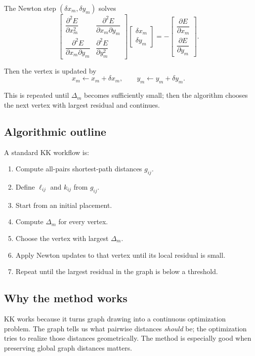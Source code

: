 \documentclass[11pt]{article}
\begin{document}
The Newton step $(\delta x_m, \delta y_m)$ solves
\[
\begin{bmatrix}
\dfrac{\partial^2 E}{\partial x_m^2} &
\dfrac{\partial^2 E}{\partial x_m \partial y_m} \\[1.2ex]
\dfrac{\partial^2 E}{\partial x_m \partial y_m} &
\dfrac{\partial^2 E}{\partial y_m^2}
\end{bmatrix}
\begin{bmatrix}
\delta x_m \\ \delta y_m
\end{bmatrix}
=
-
\begin{bmatrix}
\dfrac{\partial E}{\partial x_m} \\[1.2ex]
\dfrac{\partial E}{\partial y_m}
\end{bmatrix}.
\]

Then the vertex is updated by
\[
x_m \leftarrow x_m + \delta x_m,
\qquad
y_m \leftarrow y_m + \delta y_m.
\]

This is repeated until $\Delta_m$ becomes sufficiently small; then the
algorithm chooses the next vertex with largest residual and continues.

\subsection{Algorithmic outline}

A standard KK workflow is:
\begin{enumerate}[leftmargin=1.5em]
\item Compute all-pairs shortest-path distances $g_{ij}$.
\item Define $\ell_{ij}$ and $k_{ij}$ from $g_{ij}$.
\item Start from an initial placement.
\item Compute $\Delta_m$ for every vertex.
\item Choose the vertex with largest $\Delta_m$.
\item Apply Newton updates to that vertex until its local residual is small.
\item Repeat until the largest residual in the graph is below a threshold.
\end{enumerate}

\subsection{Why the method works}

KK works because it turns graph drawing into a continuous optimization problem.
The graph tells us what pairwise distances \emph{should} be; the optimization
tries to realize those distances geometrically. The method is especially good
when preserving global graph distances matters.
\end{document}
